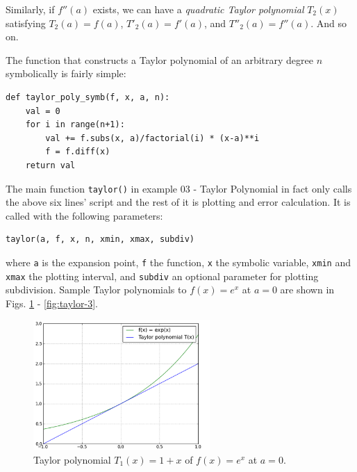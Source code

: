 \documentclass[article,A4,12pt]{llncs}
\begin{document}
Similarly, 
if $f''(a)$ exists, we can have a {\em quadratic Taylor polynomial} $T_2(x)$ satisfying
$T_2(a) = f(a)$, $T'_2(a) = f'(a)$, and $T''_2(a) = f''(a)$. And so on. 

The function that constructs a Taylor polynomial of an arbitrary degree $n$
symbolically is fairly simple:

\begin{verbatim}
def taylor_poly_symb(f, x, a, n):
    val = 0
    for i in range(n+1):
        val += f.subs(x, a)/factorial(i) * (x-a)**i
        f = f.diff(x)
    return val
\end{verbatim}
The main function {\tt taylor()} in example 03 - Taylor Polynomial in fact only calls the 
above six lines' script and the rest of it is plotting and error calculation. It is called 
with the following parameters:

\begin{verbatim}
taylor(a, f, x, n, xmin, xmax, subdiv)
\end{verbatim}
where {\tt a} is the expansion point, {\tt f} the function, {\tt x} the symbolic variable,
{\tt xmin} and {\tt xmax} the plotting interval, and {\tt subdiv} an optional parameter 
for plotting subdivision. Sample Taylor polynomials to $f(x) = e^x$ at $a = 0$
are shown in Figs. \ref{fig:taylor-1} - \ref{fig:taylor-3}.

\begin{figure}[!ht]
\begin{center}
\includegraphics[width=0.6\textwidth]{img/taylor-1.png}
\end{center}
\vspace{-2mm}
\caption{Taylor polynomial $T_1(x) = 1+x$ of $f(x) = e^x$ at $a = 0$.}
\label{fig:taylor-1}
\end{figure}

\newpage
\end{document}
